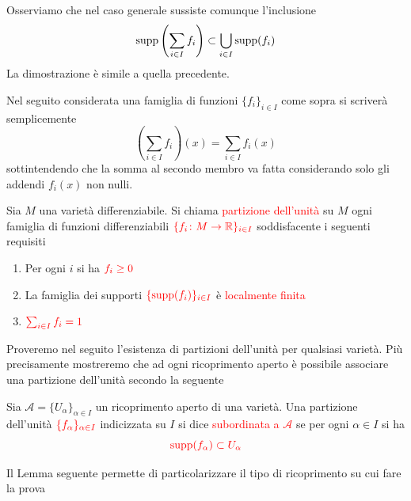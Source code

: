         \begin{osservazione}
        \label{oss:inclusione_supporto_somma_generale}
        \mbox{}

        Osserviamo che nel caso generale sussiste comunque l'inclusione
        \[
        \operatorname{supp}\left(\sum_{i \in I} f_i\right) \subset \bigcup_{i \in I} \operatorname{supp}(f_i)
        \]
        La dimostrazione è simile a quella precedente.
        \end{osservazione}
        \newpage
        Nel seguito considerata una famiglia di funzioni $\{f_i\}_{i \in I}$ come sopra si scriverà semplicemente
        \[
        \left(\sum_{i \in I} f_i\right)(x) = \sum_{i \in I} f_i(x)
        \]
        sottintendendo che la somma al secondo membro va fatta considerando solo gli addendi $f_i(x)$ non nulli.
        
        \begin{definizione}
        \label{def:partizione_unita}
        \mbox{}

        Sia $M$ una varietà differenziabile. Si chiama \textcolor{red}{partizione dell'unità} su $M$ ogni famiglia di funzioni differenziabili $\textcolor{red}{\{f_i \colon M \to \mathbb{R}\}_{i \in I}}$ soddisfacente i seguenti requisiti
        \begin{enumerate}
            \item Per ogni $i$ si ha $\textcolor{red}{f_i \geq 0}$
            \item La famiglia dei supporti $\textcolor{red}{\{\operatorname{supp}(f_i)\}_{i \in I}}$ è \textcolor{red}{localmente finita}
            \item $\textcolor{red}{\sum_{i \in I} f_i = 1}$
        \end{enumerate}
        \end{definizione}

        Proveremo nel seguito l'esistenza di partizioni dell'unità per qualsiasi varietà. Più precisamente mostreremo che ad ogni ricoprimento aperto è possibile associare una partizione dell'unità secondo la seguente

        \begin{definizione}
        \label{def:partizione_unita_subordinata}
        \mbox{}

        Sia $\mathcal{A} = \{U_\alpha\}_{\alpha \in I}$ un ricoprimento aperto di una varietà. Una partizione dell'unità $\textcolor{red}{\{f_\alpha\}_{\alpha \in I}}$ indicizzata su $I$ si dice \textcolor{red}{subordinata a $\mathcal{A}$} se per ogni $\alpha \in I$ si ha
        \[
        \textcolor{red}{\operatorname{supp}(f_\alpha) \subset U_\alpha}
        \]
        \end{definizione}
        \newpage
        Il Lemma seguente permette di particolarizzare il tipo di ricoprimento su cui fare la prova

